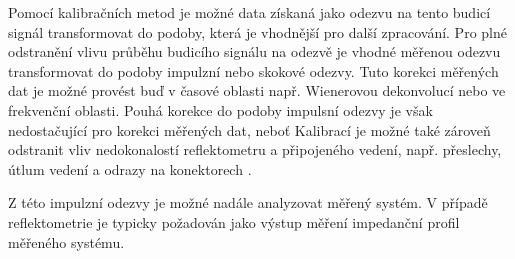 Pomocí kalibračních metod je možné data získaná jako odezvu na tento budicí signál transformovat do podoby, která je vhodnější pro další zpracování. Pro plné odstranění vlivu průběhu budicího signálu na odezvě je vhodné měřenou odezvu transformovat do podoby impulzní nebo skokové odezvy. Tuto korekci měřených dat je možné provést buď v časové oblasti např. Wienerovou dekonvolucí nebo ve frekvenční oblasti. Pouhá korekce do podoby impulsní odezvy je však nedostačující pro korekci měřených dat, neboť 
Kalibrací je možné také zároveň odstranit vliv nedokonalostí reflektometru a připojeného vedení, např. přeslechy, útlum vedení a odrazy na konektorech \cite{VNAcalibrationarticle}.

Z této impulzní odezvy je možné nadále analyzovat měřený systém. V případě reflektometrie je typicky požadován jako výstup měření impedanční profil měřeného systému. 
